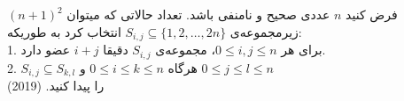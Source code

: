 فرض کنید $n$ عددی صحیح و نامنفی باشد.
تعداد حالاتی که میتوان $(n + 1)^2$ زیرمجموعه‌ی $S_{i, j} \subseteq \{1, 2, \dots, 2n\}$ انتخاب کرد
به طوریکه: \\
1. برای هر $0 \le i, j \le n$، مجموعه‌ی $S_{i, j}$ دقیقا $i + j$ عضو دارد. \\
2. $S_{i, j} \subseteq S_{k, l}$ هرگاه $0 \le i \le k \le n$ و $0 \le j \le l \le n$ \\
را پیدا کنید.
(2019)